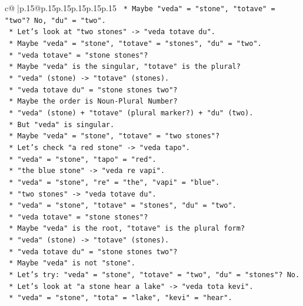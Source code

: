 \documentclass{article}
\begin{document}
{\begin{supertabular}{c@{$\;$}|p{.15\linewidth}@{}p{.15\linewidth}p{.15\linewidth}p{.15\linewidth}p{.15\linewidth}p{.15\linewidth}}
{{{\texttt{    *   Maybe "veda" = "stone", "totave" = "two"? No, "du" = "two".} \\
\texttt{    *   Let's look at "two stones" {-}> "veda totave du".} \\
\texttt{    *   Maybe "veda" = "stone", "totave" = "stones", "du" = "two".} \\
\texttt{    *   "veda totave" = "stone stones"?} \\
\texttt{    *   Maybe "veda" is the singular, "totave" is the plural?} \\
\texttt{    *   "veda" (stone) {-}> "totave" (stones).} \\
\texttt{    *   "veda totave du" = "stone stones two"?} \\
\texttt{    *   Maybe the order is Noun{-}Plural Number?} \\
\texttt{    *   "veda" (stone) + "totave" (plural marker?) + "du" (two).} \\
\texttt{    *   But "veda" is singular.} \\
\texttt{    *   Maybe "veda" = "stone", "totave" = "two stones"?} \\
\texttt{    *   Let's check "a red stone" {-}> "veda tapo".} \\
\texttt{    *   "veda" = "stone", "tapo" = "red".} \\
\texttt{    *   "the blue stone" {-}> "veda re vapi".} \\
\texttt{    *   "veda" = "stone", "re" = "the", "vapi" = "blue".} \\
\texttt{    *   "two stones" {-}> "veda totave du".} \\
\texttt{    *   "veda" = "stone", "totave" = "stones", "du" = "two".} \\
\texttt{    *   "veda totave" = "stone stones"?} \\
\texttt{    *   Maybe "veda" is the root, "totave" is the plural form?} \\
\texttt{    *   "veda" (stone) {-}> "totave" (stones).} \\
\texttt{    *   "veda totave du" = "stone stones two"?} \\
\texttt{    *   Maybe "veda" is not "stone".} \\
\texttt{    *   Let's try: "veda" = "stone", "totave" = "two", "du" = "stones"? No.} \\
\texttt{    *   Let's look at "a stone hear a lake" {-}> "veda tota kevi".} \\
\texttt{    *   "veda" = "stone", "tota" = "lake", "kevi" = "hear".} \\
}}}
\end{supertabular}}
\end{document}

